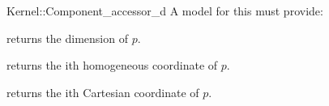 \begin{ccRefFunctionObjectConcept}{Kernel::Component_accessor_d}
A model for this must provide:


 {returns
  the dimension of $p$.}

 {returns the ith homogeneous coordinate of $p$.  }

 {returns the ith Cartesian coordinate of $p$.  }

\end{ccRefFunctionObjectConcept}
